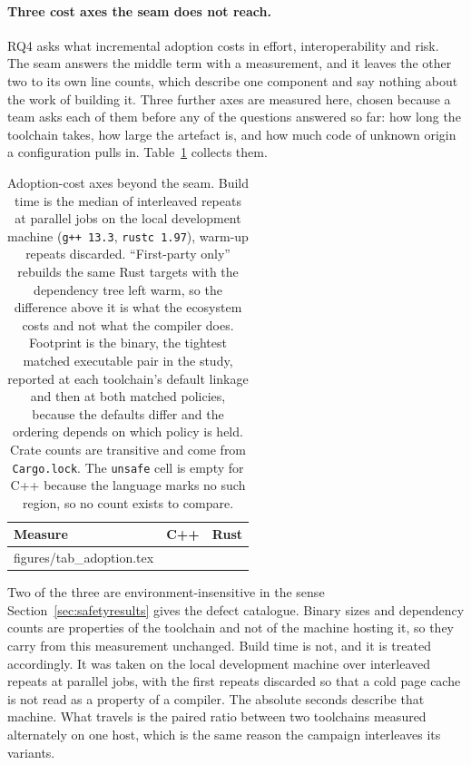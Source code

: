 \documentclass[english,oneside,a4paper,censored,csm,software-track-2020]{HYthesisML}
\makeatletter
\newcommand{\gentablebody}[1]{\@@input #1\relax}
\makeatother
\begin{document}
\paragraph{Three cost axes the seam does not reach.}
RQ4 asks what incremental adoption costs in effort, interoperability and risk. The seam answers
the middle term with a measurement, and it leaves the other two to its own line counts, which
describe one component and say nothing about the work of building it. Three further axes are
measured here, chosen because a team asks each of them before any of the questions answered so
far: how long the toolchain takes, how large the artefact is, and how much code of unknown origin
a configuration pulls in. Table~\ref{tab:adoption} collects them.

\begin{table}[H]
\centering
\small
\caption[Adoption-cost axes: build time, static footprint, third-party surface]{Adoption-cost
axes beyond the seam. Build time is the median of \AdoptRepeats{} interleaved repeats at
\AdoptJobs{} parallel jobs on the local development machine (\texttt{g++~13.3},
\texttt{rustc~1.97}), warm-up repeats discarded. ``First-party only'' rebuilds the same Rust
targets with the dependency tree left warm, so the difference above it is what the ecosystem
costs and not what the compiler does. Footprint is the \texttt{\FootTarget} binary, the tightest
matched executable pair in the study, reported at each toolchain's default linkage and then at
both matched policies, because the defaults differ and the ordering depends on which policy is
held. Crate counts are transitive and come from \texttt{Cargo.lock}. The \texttt{unsafe} cell is
empty for C++ because the language marks no such region, so no count exists to
compare.\label{tab:adoption}}
\begin{tabular}{@{}l r r@{}}
\hline\hline
Measure & C++ & Rust \\
\hline
\gentablebody{figures/tab_adoption.tex}\\
\hline
\end{tabular}
\end{table}

Two of the three are environment-insensitive in the sense
Section~\ref{sec:safetyresults} gives the defect catalogue. Binary sizes and dependency counts are
properties of the toolchain and not of the machine hosting it, so they carry from this measurement
unchanged. Build time is not, and it is treated accordingly. It was taken on the local development
machine over \AdoptRepeats{} interleaved repeats at \AdoptJobs{} parallel jobs, with the first
repeats discarded so that a cold page cache is not read as a property of a compiler. The absolute
seconds describe that machine. What travels is the paired ratio between two toolchains measured
alternately on one host, which is the same reason the campaign interleaves its variants.
\end{document}
